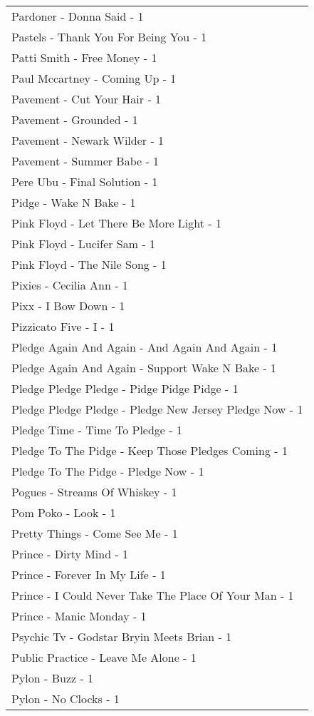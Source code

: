\documentclass[
]{article}
\begin{document}
\begin{longtable}{l}
Pardoner - Donna Said - 1 \\ 
Pastels - Thank You For Being You - 1 \\ 
Patti Smith - Free Money - 1 \\ 
Paul Mccartney - Coming Up - 1 \\ 
Pavement - Cut Your Hair - 1 \\ 
Pavement - Grounded - 1 \\ 
Pavement - Newark Wilder - 1 \\ 
Pavement - Summer Babe - 1 \\ 
Pere Ubu - Final Solution - 1 \\ 
Pidge - Wake N Bake - 1 \\ 
Pink Floyd - Let There Be More Light - 1 \\ 
Pink Floyd - Lucifer Sam - 1 \\ 
Pink Floyd - The Nile Song - 1 \\ 
Pixies - Cecilia Ann - 1 \\ 
Pixx - I Bow Down - 1 \\ 
Pizzicato Five - I - 1 \\ 
Pledge Again And Again - And Again And Again - 1 \\ 
Pledge Again And Again - Support Wake N Bake - 1 \\ 
Pledge Pledge Pledge - Pidge Pidge Pidge - 1 \\ 
Pledge Pledge Pledge - Pledge New Jersey Pledge Now - 1 \\ 
Pledge Time - Time To Pledge - 1 \\ 
Pledge To The Pidge - Keep Those Pledges Coming - 1 \\ 
Pledge To The Pidge - Pledge Now - 1 \\ 
Pogues - Streams Of Whiskey - 1 \\ 
Pom Poko - Look - 1 \\ 
Pretty Things - Come See Me - 1 \\ 
Prince - Dirty Mind - 1 \\ 
Prince - Forever In My Life - 1 \\ 
Prince - I Could Never Take The Place Of Your Man - 1 \\ 
Prince - Manic Monday - 1 \\ 
Psychic Tv - Godstar Bryin Meets Brian - 1 \\ 
Public Practice - Leave Me Alone - 1 \\ 
Pylon - Buzz - 1 \\ 
Pylon - No Clocks - 1 \\ 

\end{longtable}
\end{document}
